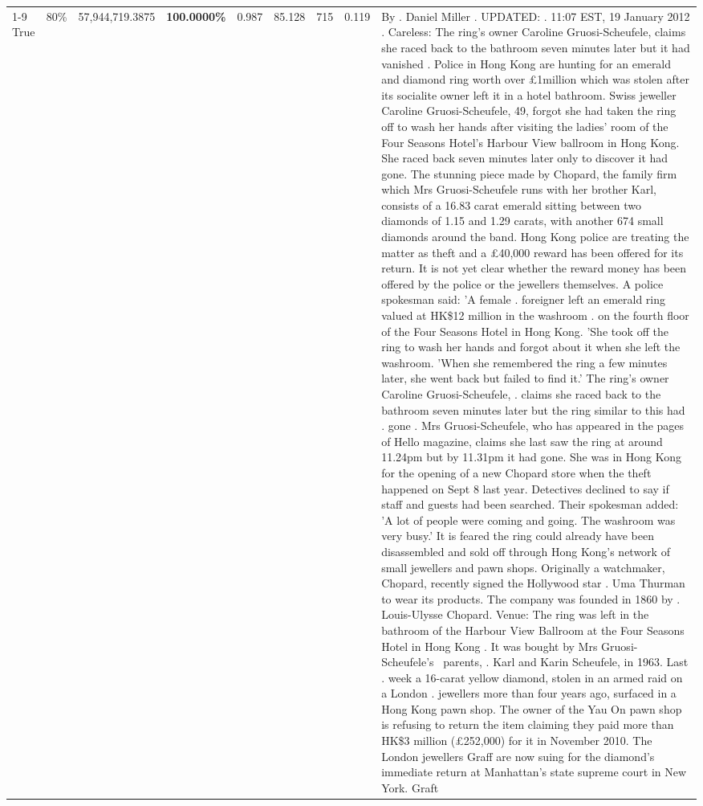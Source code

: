 \begin{table}[H]
\begin{tabular}{lllrlllll}
\cline{1-9} \cline{2-9}
True & 80\% & 57,944,719.3875 & \bfseries \color{red} 100.0000\% & 0.987 & 85.128 & 715 & 0.119 & By . Daniel Miller . UPDATED: . 11:07 EST, 19 January 2012 . Careless: The ring's owner Caroline Gruosi-Scheufele, claims she raced back to the bathroom seven minutes later but it had vanished . Police in Hong Kong are hunting for an emerald and diamond ring worth over £1million which was stolen after its socialite owner left it in a hotel bathroom. Swiss jeweller Caroline Gruosi-Scheufele, 49, forgot she had taken the ring off to wash her hands after visiting the ladies' room of the Four Seasons Hotel's Harbour View ballroom in Hong Kong. She raced back seven minutes later only to discover it had gone. The stunning piece made by Chopard, the family firm which Mrs Gruosi-Scheufele runs with her brother Karl, consists of a 16.83 carat emerald sitting between two diamonds of 1.15 and 1.29 carats, with another 674 small diamonds around the band. Hong Kong police are treating the matter as theft and a £40,000 reward has been offered for its return. It is not yet clear whether the reward money has been offered by the police or the jewellers themselves. A police spokesman said: 'A female . foreigner left an emerald ring valued at HK\$12 million in the washroom . on the fourth floor of the Four Seasons Hotel in Hong Kong. 'She took off the ring to wash her hands and forgot about it when she left the washroom. 'When she remembered the ring a few minutes later, she went back but failed to find it.' The ring's owner Caroline Gruosi-Scheufele, . claims she raced back to the bathroom seven minutes later but the ring similar to this had . gone . Mrs Gruosi-Scheufele, who has appeared in the pages of Hello magazine, claims she last saw the ring at around 11.24pm but by 11.31pm it had gone. She was in Hong Kong for the opening of a new Chopard store when the theft happened on Sept 8 last year. Detectives declined to say if staff and guests had been searched. Their spokesman added: 'A lot of people were coming and going. The washroom was very busy.' It is feared the ring could already have been disassembled and sold off through Hong Kong's network of small jewellers and pawn shops. Originally a watchmaker, Chopard, recently signed the Hollywood star . Uma Thurman to wear its products. The company was founded in 1860 by . Louis-Ulysse Chopard. Venue: The ring was left in the bathroom of the Harbour View Ballroom at the Four Seasons Hotel in Hong Kong . It was bought by Mrs Gruosi-Scheufele's  parents, . Karl and Karin Scheufele, in 1963. Last . week a 16-carat yellow diamond, stolen in an armed raid on a London . jewellers more than four years ago, surfaced in a Hong Kong pawn shop. The owner of the Yau On pawn shop is refusing to return the item claiming they paid more than HK\$3 million (£252,000) for it in November 2010. The London jewellers Graff are now suing for the diamond’s immediate return at Manhattan’s state supreme court in New York. Graft \\

\end{tabular}
\end{table}
